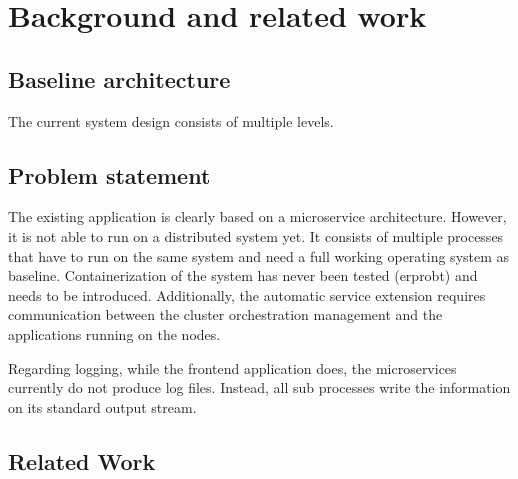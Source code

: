 
\chapter{Background and related work} %

\label{chap:background} %




\section{Baseline architecture}
The current system design consists of multiple levels.



\section{Problem statement}
The existing application is clearly based on a microservice architecture.  However, it is not able to run on a distributed system yet. It consists of multiple processes that have to run on the same system and need a full working operating system as baseline. Containerization of the system has never been tested (erprobt) and needs to be introduced. 
Additionally, the automatic service extension requires communication between the cluster orchestration management and the applications running on the nodes.

Regarding logging, while the frontend application does, the microservices currently do not produce log files. Instead, all sub processes write the information on its standard output stream.

\section{Related Work}
